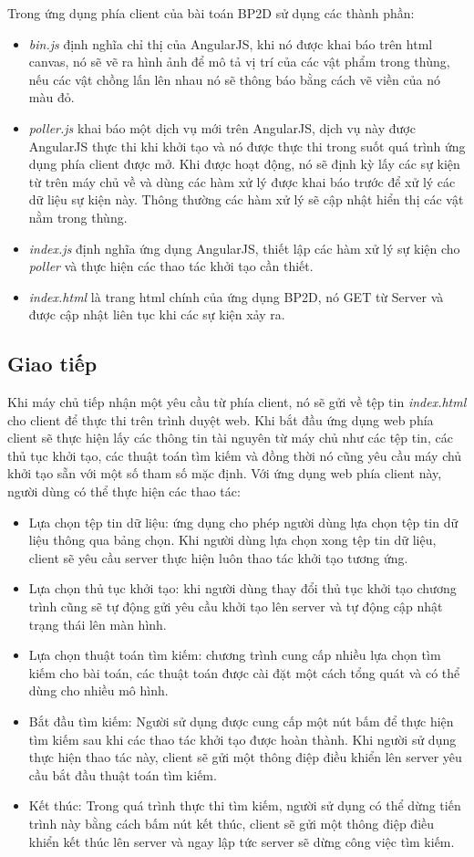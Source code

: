 Trong ứng dụng phía client của bài toán BP2D sử dụng các thành phần:
\begin{itemize}
	\item \textit{bin.js} định nghĩa chỉ thị của AngularJS, khi nó được khai báo trên html canvas, nó sẽ vẽ ra hình ảnh để mô tả vị trí của các vật phẩm trong thùng, nếu các vật chồng lấn lên nhau nó sẽ thông báo bằng cách vẽ viền của nó màu đỏ.
	\item \textit{poller.js} khai báo một dịch vụ mới trên AngularJS, dịch vụ này được AngularJS thực thi khi khởi tạo và nó được thực thi trong suốt quá trình ứng dụng phía client được mở. Khi được hoạt động, nó sẽ định kỳ lấy các sự kiện từ trên máy chủ về và dùng các hàm xử lý được khai báo trước để xử lý các dữ liệu sự kiện này. Thông thường các hàm xử lý sẽ cập nhật hiển thị các vật nằm trong thùng.
	\item \textit{index.js} định nghĩa ứng dụng AngularJS, thiết lập các hàm xử lý sự kiện cho \textit{poller} và thực hiện các thao tác khởi tạo cần thiết.
	\item \textit{index.html} là trang html chính của ứng dụng BP2D, nó GET từ Server và được cập nhật liên tục khi các sự kiện xảy ra.
\end{itemize}
\subsection{Giao tiếp}
Khi máy chủ tiếp nhận một yêu cầu từ phía client, nó sẽ gửi về tệp tin \textit{index.html} cho client để thực thi trên trình duyệt web. Khi bắt đầu ứng dụng web phía client sẽ thực hiện lấy các thông tin tài nguyên từ máy chủ như các tệp tin, các thủ tục khởi tạo, các thuật toán tìm kiếm và đồng thời nó cũng yêu cầu máy chủ khởi tạo sẵn với một số tham số mặc định. Với ứng dụng web phía client này, người dùng có thể thực hiện các thao tác:
\begin{itemize}
	\item Lựa chọn tệp tin dữ liệu: ứng dụng cho phép người dùng lựa chọn tệp tin dữ liệu thông qua bảng chọn. Khi người dùng lựa chọn xong tệp tin dữ liệu, client sẽ yêu cầu server thực hiện luôn thao tác khởi tạo tương ứng.
	\item Lựa chọn thủ tục khởi tạo: khi người dùng thay đổi thủ tục khởi tạo chương trình cũng sẽ tự động gửi yêu cầu khởi tạo lên server và tự động cập nhật trạng thái lên màn hình.
	\item Lựa chọn thuật toán tìm kiếm: chương trình cung cấp nhiều lựa chọn tìm kiếm cho bài toán, các thuật toán được cài đặt một cách tổng quát và có thể dùng cho nhiều mô hình.
	\item Bắt đầu tìm kiếm: Người sử dụng được cung cấp một nút bấm để thực hiện tìm kiếm sau khi các thao tác khởi tạo được hoàn thành. Khi người sử dụng thực hiện thao tác này, client sẽ gửi một thông điệp điều khiển lên server yêu cầu bắt đầu thuật toán tìm kiếm.
	\item Kết thúc: Trong quá trình thực thi tìm kiếm, người sử dụng có thể dừng tiến trình này bằng cách bấm nút kết thúc, client sẽ gửi một thông điệp điều khiển kết thúc lên server và ngay lập tức server sẽ dừng công việc tìm kiếm.
\end{itemize}

